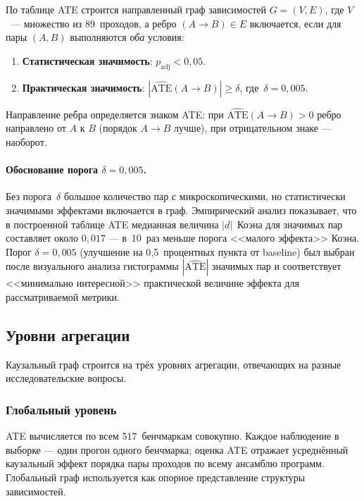 По таблице ATE строится направленный граф зависимостей $G = (V, E)$, где $V$~--- множество из 89~проходов, а ребро $(A \to B) \in E$ включается, если для пары $(A, B)$ выполняются \emph{оба} условия:

\begin{enumerate}
    \item \textbf{Статистическая значимость}: $p_{\text{adj}} < 0{,}05$.
    \item \textbf{Практическая значимость}: $|\widehat{\text{ATE}}(A \to B)| \geqslant \delta$, где~$\delta = 0{,}005$.
\end{enumerate}

Направление ребра определяется знаком ATE: при $\widehat{\text{ATE}}(A \to B) > 0$ ребро направлено от $A$ к $B$ (порядок $A \to B$ лучше), при отрицательном знаке --- наоборот.

\paragraph{Обоснование порога $\delta = 0{,}005$.} Без порога~$\delta$ большое количество пар с микроскопическими, но статистически значимыми эффектами включается в граф. Эмпирический анализ показывает, что в построенной таблице ATE медианная величина $|d|$~Коэна для значимых пар составляет около $0{,}017$ --- в~10~раз меньше порога <<малого эффекта>> Коэна. Порог $\delta = 0{,}005$ (улучшение на 0{,}5~процентных пункта от baseline) был выбран после визуального анализа гистограммы $|\widehat{\text{ATE}}|$ значимых пар и соответствует <<минимально интересной>> практической величине эффекта для рассматриваемой метрики.

\subsection{Уровни агрегации}

Каузальный граф строится на трёх уровнях агрегации, отвечающих на разные исследовательские вопросы.

\subsubsection{Глобальный уровень}

ATE вычисляется по всем 517~бенчмаркам совокупно. Каждое наблюдение в выборке --- один прогон одного бенчмарка; оценка ATE отражает усреднённый каузальный эффект порядка пары проходов по всему ансамблю программ. Глобальный граф используется как опорное представление структуры зависимостей.

